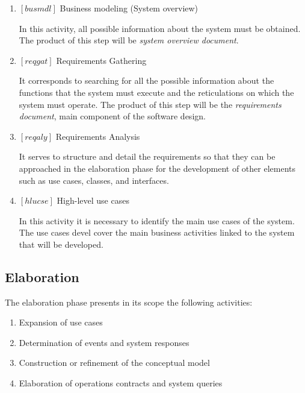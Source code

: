 \documentclass[11pt, twoside, a4paper]{book}
\begin{document}
	        			\begin{enumerate}
	        				
	        				\item $[busmdl]$ Business modeling (System overview)
	        					
								In this activity, all possible information about the system must be obtained. The product of this step will be \emph{system overview document}.        				
	        						
					        \item $[reqgat]$ Requirements Gathering
					        
					        	It corresponds to searching for all the possible information about the functions that the system must execute and the reticulations on which the system must operate. The product of this step will be the \emph{requirements document}, main component of the software design.
					        	
							\item $[reqaly]$ Requirements Analysis
							
								It serves to structure and detail the requirements so that they can be approached in the elaboration phase for the development of other elements such as use cases, classes, and interfaces.

							\item $[hlucse]$ High-level use cases
								
								In this activity it is necessary to identify the main use cases of the system. The use cases devel cover the main business activities linked to the system that will be developed.
								
	        			\end{enumerate}
	        			
    	    		\subsection{Elaboration}
    	    		
    	    			The elaboration phase presents in its scope the following activities:
	        			
	        			\begin{enumerate}
	        				
							\item Expansion of use cases								
							\item Determination of events and system responses
							\item Construction or refinement of the conceptual model
							\item Elaboration of operations contracts and system queries
							
	        			\end{enumerate}
	        			
\end{document}

